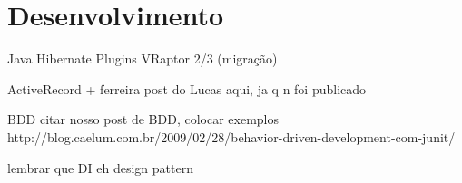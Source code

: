 \section{Desenvolvimento}


Java
Hibernate
Plugins
VRaptor 2/3 (migração)

ActiveRecord + ferreira
post do Lucas aqui, ja q n foi publicado

BDD
citar nosso post de BDD, colocar exemplos
http://blog.caelum.com.br/2009/02/28/behavior-driven-development-com-junit/

lembrar que DI eh design pattern
